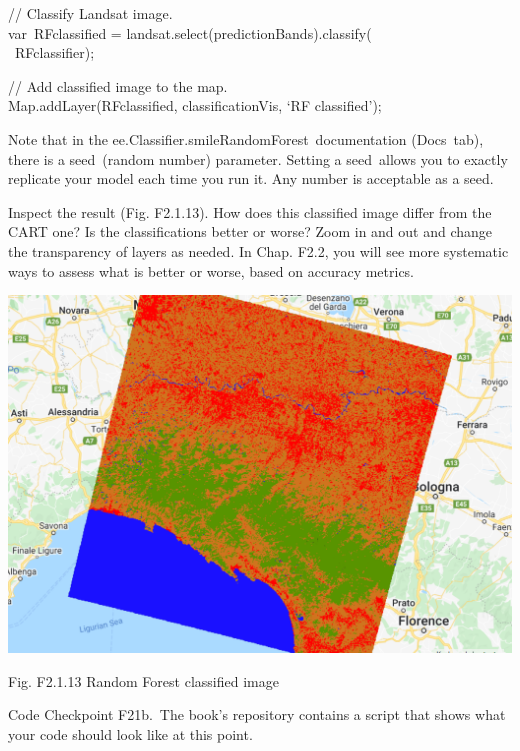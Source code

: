\documentclass[
  letterpaper,
  DIV=11,
  numbers=noendperiod]{scrreprt}
\begin{document}
// Classify Landsat image.\\
var~RFclassified = landsat.select(predictionBands).classify(\\
\hspace*{0.333em} ~RFclassifier);

// Add classified image to the map.\\
Map.addLayer(RFclassified, classificationVis, `RF classified');

Note that in the ee.Classifier.smileRandomForest~documentation
(Docs~tab), there is a seed~(random number) parameter. Setting a
seed~allows you to exactly replicate your model each time you run it.
Any number is acceptable as a seed.

Inspect the result (Fig. F2.1.13). How does this classified image differ
from the CART one? Is the classifications better or worse? Zoom in and
out and change the transparency of layers as needed. In Chap. F2.2, you
will see more systematic ways to assess what is better or worse, based
on accuracy metrics.

\includegraphics{./F2/image34.png}

Fig. F2.1.13 Random Forest classified image

\begin{tcolorbox}[enhanced jigsaw, left=2mm, breakable, rightrule=.15mm, opacityback=0, colframe=quarto-callout-note-color-frame, colbacktitle=quarto-callout-note-color!10!white, arc=.35mm, opacitybacktitle=0.6, toptitle=1mm, colback=white, leftrule=.75mm, title=\textcolor{quarto-callout-note-color}{\faInfo}\hspace{0.5em}{Note}, toprule=.15mm, bottomtitle=1mm, titlerule=0mm, bottomrule=.15mm, coltitle=black]

Code Checkpoint F21b.~The book's repository contains a script that shows
what your code should look like at this point.

\end{tcolorbox}
\end{document}
